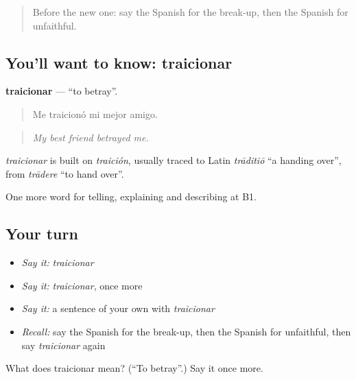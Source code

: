 \begin{quote}
Before the new one: say the Spanish for the break-up, then the Spanish for unfaithful.
\end{quote}

\subsection*{You'll want to know: traicionar}
\textbf{traicionar} — \textquotedblleft{}to betray\textquotedblright{}.

\begin{quote}
Me traicionó mi mejor amigo.
\end{quote}

\begin{quote}
\emph{My best friend betrayed me.}
\end{quote}

\begin{cousinweb}
\emph{traicionar} is built on \emph{traición}, usually traced to Latin \emph{trāditiō} \textquotedblleft{}a handing over\textquotedblright{}, from \emph{trādere} \textquotedblleft{}to hand over\textquotedblright{}.
\end{cousinweb}

\begin{grammarlens}[title={What you've built}]
One more word for telling, explaining and describing at B1.
\end{grammarlens}

\subsection*{Your turn}
\begin{itemize}
\raggedright
  \item \emph{Say it:} \emph{traicionar}
  \item \emph{Say it:} \emph{traicionar}, once more
  \item \emph{Say it:} a sentence of your own with \emph{traicionar}
  \item \emph{Recall:} say the Spanish for the break-up, then the Spanish for unfaithful, then say \emph{traicionar} again
\end{itemize}

\begin{tcolorbox}[breakable,colback=teal!4,colframe=teal!35!black,title={Before you move on}]
What does traicionar mean? (\textquotedblleft{}To betray\textquotedblright{}.) Say it once more.
\end{tcolorbox}
